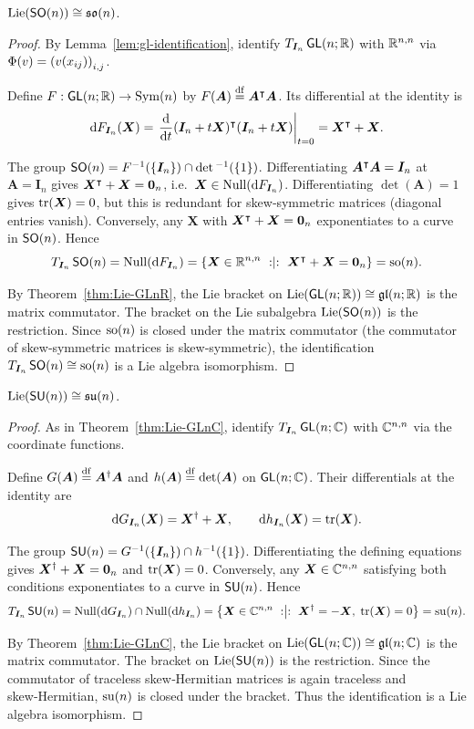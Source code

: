 \documentclass[11pt,reqno]{amsart}
\DeclareMathOperator{\Lie}{Lie}
\begin{document}
\begin{Thm}\label{thm:Lie-SOn}
$\Lie\Br{\SO(n)} \cong \so(n)$.
\end{Thm}
\begin{proof}
  By Lemma~\ref{lem:gl-identification}, identify $T_{\bm I_n}\operatorname{\mathsf{GL}}(n;\mathbb{R})$
  with $\mathbb{R}^{n,n}$ via $\Phi(v)=\Br{v(x_{ij})}_{i,j}$.

  Define $F:\operatorname{\mathsf{GL}}(n;\mathbb{R})\to\operatorname{Sym}(n)$ by
  $F(\bm A)\stackrel{\mathrm{df}}{=}\bm A^{\intercal}\bm A$.  Its differential at the identity is
  \[
    \dd F_{\bm I_n}(\bm X)
    =\eval{\frac{\dd}{\dd t}(\bm I_n+t\bm X)\transp(\bm I_n+t\bm X)}_{t=0}
    =\bm X\transp+\bm X.
  \]

  The group $\SO(n)=F^{-1}(\set{\bm I_n})\cap\det{}^{-1}(\set{1})$.
  Differentiating $\bm A^{\intercal}\bm A=\bm I_n$ at $\bm A=\bm I_n$ gives
  $\bm X^{\intercal}+\bm X=\bm0_n$, i.e.\ $\bm X\in\Null{\dd F_{\bm I_n}}$.
  Differentiating $\det(\bm A)=1$ gives $\operatorname{tr}(\bm X)=0$, but this is
  redundant for skew‑symmetric matrices (diagonal entries vanish).
  Conversely, any $\bm X$ with $\bm X^{\intercal}+\bm X=\bm0_n$ exponentiates
  to a curve in $\operatorname{\mathsf{SO}}(n)$.  Hence
  \[
    T_{\bm I_n}\SO(n)=\Null{\dd F_{\bm I_n}}
    =\set{\bm X\in\R^{n,n}\st\bm X\transp+\bm X=\bm0_n}
    =\soset(n).
  \]

  By Theorem~\ref{thm:Lie-GLnR}, the Lie bracket on
  $\Lie\Br{\GL(n;\R)}\cong\gl(n;\R)$ is the matrix commutator.
  The bracket on the Lie subalgebra $\Lie\Br{\SO(n)}$ is the restriction.
  Since $\operatorname{so}(n)$ is closed under the matrix commutator (the commutator
  of skew‑symmetric matrices is skew‑symmetric), the identification
  $T_{\bm I_n}\operatorname{\mathsf{SO}}(n)\cong\operatorname{so}(n)$ is a Lie algebra isomorphism.
\end{proof}


\begin{Thm}\label{thm:Lie-SUn}
$\Lie\Br{\SU(n)} \cong \su(n)$.
\end{Thm}
\begin{proof}
  As in Theorem~\ref{thm:Lie-GLnC}, identify
  $T_{\bm I_n}\operatorname{\mathsf{GL}}(n;\mathbb{C})$ with $\mathbb{C}^{n,n}$ via the coordinate functions.

  Define $G(\bm A)\stackrel{\mathrm{df}}{=}\bm A^{\dagger}\bm A$ and $h(\bm A)\df\det\Br{\bm A}$ on
  $\operatorname{\mathsf{GL}}(n;\mathbb{C})$.  Their differentials at the identity are
  \[
    \mathrm{d} G_{\bm I_n}(\bm X)=\bm X^{\dagger}+\bm X,\qquad
    \mathrm{d} h_{\bm I_n}(\bm X)=\operatorname{tr}(\bm X).
  \]

  The group $\SU(n)=G^{-1}(\set{\bm I_n})\cap h^{-1}(\set{1})$.
  Differentiating the defining equations gives
  $\bm X^{\dagger}+\bm X=\bm0_n$ and $\operatorname{tr}(\bm X)=0$.  Conversely, any
  $\bm X\in\mathbb{C}^{n,n}$ satisfying both conditions exponentiates to a
  curve in $\operatorname{\mathsf{SU}}(n)$.  Hence
  \[
    T_{\bm I_n}\SU(n)=\Null{\dd G_{\bm I_n}}\cap\Null{\dd h_{\bm I_n}}
    =\set{\bm X\in\C^{n,n}\st\bm X\herm=-\bm X,\;\tr(\bm X)=0}
    =\suset(n).
  \]

  By Theorem~\ref{thm:Lie-GLnC}, the Lie bracket on
  $\Lie\Br{\GL(n;\C)}\cong\gl(n;\C)$ is the matrix commutator.
  The bracket on $\Lie\Br{\SU(n)}$ is the restriction.  Since the
  commutator of traceless skew‑Hermitian matrices is again traceless
  and skew‑Hermitian, $\operatorname{su}(n)$ is closed under the bracket.
  Thus the identification is a Lie algebra isomorphism.
\end{proof}
\end{document}
